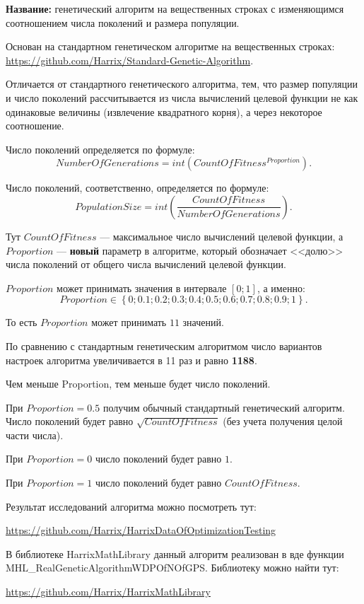 \documentclass[a4paper,12pt]{article}
\begin{document}
\textbf{Название:} генетический алгоритм на вещественных строках с изменяющимся соотношением числа поколений и размера популяции.

Основан на стандартном генетическом алгоритме на вещественных строках:  \href{https://github.com/Harrix/Standard-Genetic-Algorithm}{https://github.com/Harrix/Standard-Genetic-Algorithm}. 

Отличается от стандартного генетического алгоритма, тем, что размер популяции и число поколений рассчитывается из числа вычислений целевой функции не как одинаковые величины (извлечение квадратного корня), а через некоторое соотношение.

Число поколений определяется по формуле:
\begin{equation}
NumberOfGenerations = int \left( CountOfFitness^{Proportion}\right).
\end{equation}

Число поколений, соответственно, определяется по формуле:
\begin{equation}
PopulationSize = int \left( \dfrac{CountOfFitness}{NumberOfGenerations}\right).
\end{equation}


Тут $CountOfFitness$ --- максимальное число вычислений целевой функции, а $Proportion$ --- \textbf{новый} параметр в алгоритме, который обозначает <<долю>> числа поколений от общего числа вычислений целевой функции.

$Proportion$ может принимать значения в интервале $ [0;1] $, а именно:
\begin{equation}
Proportion \in \left\lbrace 0; 0.1; 0.2; 0.3; 0.4; 0.5; 0.6; 0.7; 0.8; 0.9; 1\right\rbrace .
\end{equation}

То есть $Proportion$ может принимать $ 11 $ значений.

По сравнению с стандартным генетическим алгоритмом число вариантов настроек алгоритма увеличивается в 11 раз и равно \textbf{1188}.

Чем меньше Proportion, тем меньше будет число поколений.

При $ Proportion=0.5 $ получим обычный стандартный генетический алгоритм. Число поколений будет равно $ \sqrt{CountOfFitness}$ (без учета получения целой части числа).

При $ Proportion=0 $ число поколений будет равно $ 1 $.

При $ Proportion=1 $ число поколений будет равно $ CountOfFitness $.

Результат исследований алгоритма можно посмотреть тут:

\href{https://github.com/Harrix/HarrixDataOfOptimizationTesting}{https://github.com/Harrix/HarrixDataOfOptimizationTesting}

В библиотеке HarrixMathLibrary данный алгоритм реализован в вде функции MHL\_RealGeneticAlgorithmWDPOfNOfGPS. Библиотеку можно найти тут:

\href{https://github.com/Harrix/HarrixMathLibrary}{https://github.com/Harrix/HarrixMathLibrary}

\newpage
\end{document}
